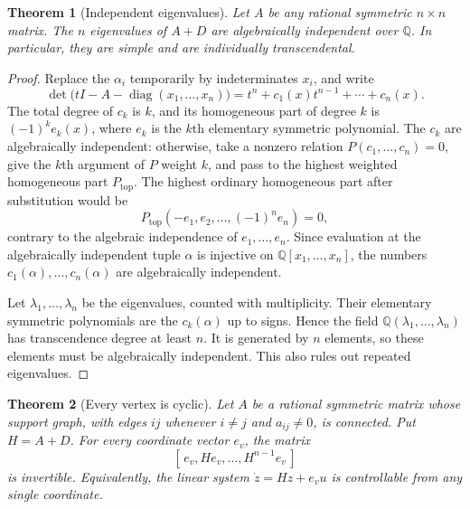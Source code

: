 \documentclass[11pt,a4paper]{article}
\newtheorem{theorem}{Theorem}[section]
\theoremstyle{definition}
\theoremstyle{remark}
\numberwithin{equation}{section}
\begin{document}
\begin{theorem}[Independent eigenvalues]
\label{enc:thm:independent-eigenvalues}
Let $A$ be any rational symmetric $n\times n$ matrix.  The $n$
eigenvalues of $A+D$ are algebraically independent over $\mathbb Q$.
In particular, they are simple and are individually transcendental.
\end{theorem}

\begin{proof}
Replace the $\alpha_i$ temporarily by indeterminates $x_i$, and write
\[
 \det\bigl(tI-A-\operatorname{diag}(x_1,\ldots,x_n)\bigr)
 =t^n+c_1(x)t^{n-1}+\cdots+c_n(x).
\]
The total degree of $c_k$ is $k$, and its homogeneous part of degree
$k$ is $(-1)^k e_k(x)$, where $e_k$ is the $k$th elementary symmetric
polynomial.  The $c_k$ are algebraically independent: otherwise, take
a nonzero relation $P(c_1,\ldots,c_n)=0$, give the $k$th argument of
$P$ weight $k$, and pass to the highest weighted homogeneous part
$P_\mathrm{top}$.  The highest ordinary homogeneous part after
substitution would be
\[
 P_\mathrm{top}(-e_1,e_2,\ldots,(-1)^n e_n)=0,
\]
contrary to the algebraic independence of $e_1,\ldots,e_n$.
Since evaluation at the algebraically independent tuple $\alpha$ is
injective on $\mathbb Q[x_1,\ldots,x_n]$, the numbers
$c_1(\alpha),\ldots,c_n(\alpha)$ are algebraically independent.

Let $\lambda_1,\ldots,\lambda_n$ be the eigenvalues, counted with
multiplicity.  Their elementary symmetric polynomials are the
$c_k(\alpha)$ up to signs.  Hence the field
$\mathbb Q(\lambda_1,\ldots,\lambda_n)$ has transcendence degree at
least $n$.  It is generated by $n$ elements, so these elements must be
algebraically independent.  This also rules out repeated eigenvalues.
\end{proof}

\begin{theorem}[Every vertex is cyclic]
\label{enc:thm:every-vertex-cyclic}
Let $A$ be a rational symmetric matrix whose support graph, with edges
$ij$ whenever $i\ne j$ and $a_{ij}\ne0$, is connected.  Put $H=A+D$.
For every coordinate vector $e_v$, the matrix
\[
 [\,e_v,He_v,\ldots,H^{n-1}e_v\,]
\]
is invertible.  Equivalently, the linear system
$\dot z=Hz+e_v u$ is controllable from any single coordinate.
\end{theorem}
\end{document}
